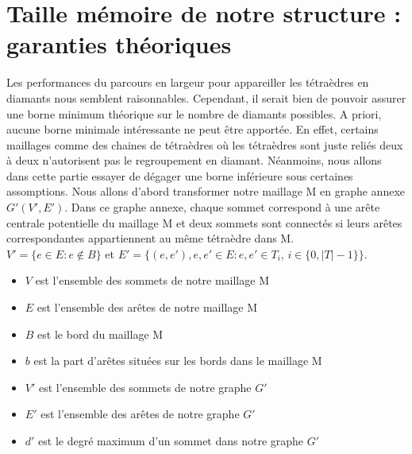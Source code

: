 \section{Taille mémoire de notre structure : garanties théoriques}
\noindent
Les performances du parcours en largeur pour appareiller les tétraèdres en diamants nous semblent raisonnables. Cependant, il serait bien de pouvoir assurer une borne minimum théorique sur le nombre de diamants possibles. A priori, aucune borne minimale intéressante ne peut être apportée. En effet, certains maillages comme des chaines de tétraèdres où les tétraèdres sont juste reliés deux à deux n'autorisent pas le regroupement en diamant. Néanmoins, nous allons dans cette partie essayer de dégager une borne inférieure sous certaines assomptions. Nous allons d'abord transformer notre maillage M en graphe annexe $G'(V',E')$. Dans ce graphe annexe, chaque sommet correspond à une arête centrale potentielle du maillage M et deux sommets sont connectés si leurs arêtes correspondantes appartiennent au même tétraèdre dans M.\\
$V' = \{e\in E : e\notin B\}$ et $E'=\{(e,e'), e,e'\in E : e,e' \in T_i, \,  i\in \{0,|T|-1\}\}$.
\begin{itemize}
\item $V$ est l'ensemble des sommets de notre maillage M
\item $E$ est l'ensemble des arêtes de notre maillage M
\item $B$ est le bord du maillage M
\item $b$ est la part d'arêtes situées sur les bords dans le maillage M
\item $V'$ est l'ensemble des sommets de notre graphe $G'$
\item $E'$ est l'ensemble des arêtes de notre graphe $G'$
\item $d'$ est le degré maximum d'un sommet dans notre graphe $G'$
\end{itemize}

